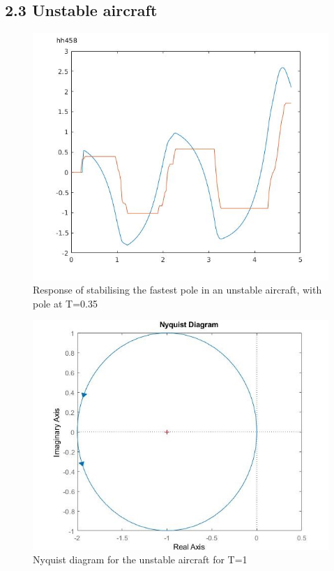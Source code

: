 \documentclass[twoside,twocolumn]{article}
\begin{document}

\subsection{2.3 Unstable aircraft}
\begin{figure}[h]
  \centering
    \includegraphics[width=\linewidth]{2-3_T=0-35}
  \caption{Response of stabilising the fastest pole in an unstable aircraft, with pole at T=0.35}
  \label{fig:2-3fastest}
\end{figure}


\begin{figure}[h]
  \centering
    \includegraphics[width=\linewidth]{2-3_nyquist}
  \caption{Nyquist diagram for the unstable aircraft for T=1}
  \label{fig:2-3nyquist}
\end{figure}
\end{document}
